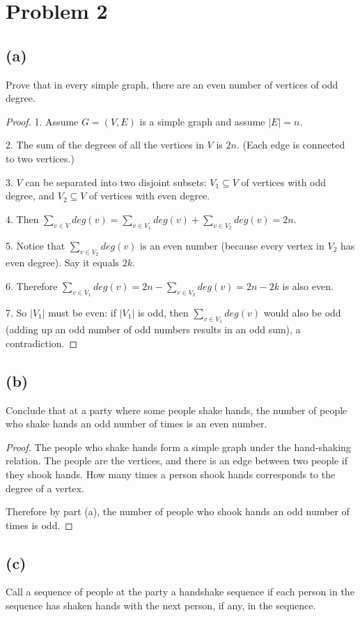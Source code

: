 \documentclass[14pt]{extarticle}
\begin{document}
\section{Problem 2}
\subsection{(a)}
Prove that in every simple graph, there are an even number of vertices of odd degree.
\begin{proof}
1. Assume $G = (V, E)$ is a simple graph and assume $|E| = n$.

2. The sum of the degrees of all the vertices in $V$ is $2n$. (Each edge is connected to two vertices.)

3. $V$ can be separated into two disjoint subsets: $V_1 \subseteq V$ of vertices with odd degree, and $V_2 \subseteq V$ of vertices with even degree.

4. Then $\sum_{v \in V} deg(v) = \sum_{v \in V_1} deg(v) + \sum_{v \in V_2} deg(v) = 2n$.

5. Notice that $\sum_{v \in V_2} deg(v)$ is an even number (because every vertex in $V_2$ has even degree). Say it equals $2k$.

6. Therefore $\sum_{v \in V_1} deg(v) = 2n - \sum_{v \in V_2} deg(v) = 2n - 2k$ is also even.

7. So $|V_1|$ must be even: if $|V_1|$ is odd, then $\sum_{v \in V_1} deg(v)$ would also be odd (adding up an odd number of odd numbers results in an odd sum), a contradiction.
\end{proof}

\subsection{(b)}
Conclude that at a party where some people shake hands, the number of people who shake hands an odd number of times is an even number.
\begin{proof}
The people who shake hands form a simple graph under the hand-shaking relation. The people are the vertices, and there is an edge between two people if they shook hands. How many times a person shook hands corresponds to the degree of a vertex.

Therefore by part (a), the number of people who shook hands an odd number of times is odd.
\end{proof}

\subsection{(c)}
Call a sequence of people at the party a handshake sequence if each person in the sequence has shaken hands with the next person, if any, in the sequence.
\end{document}
